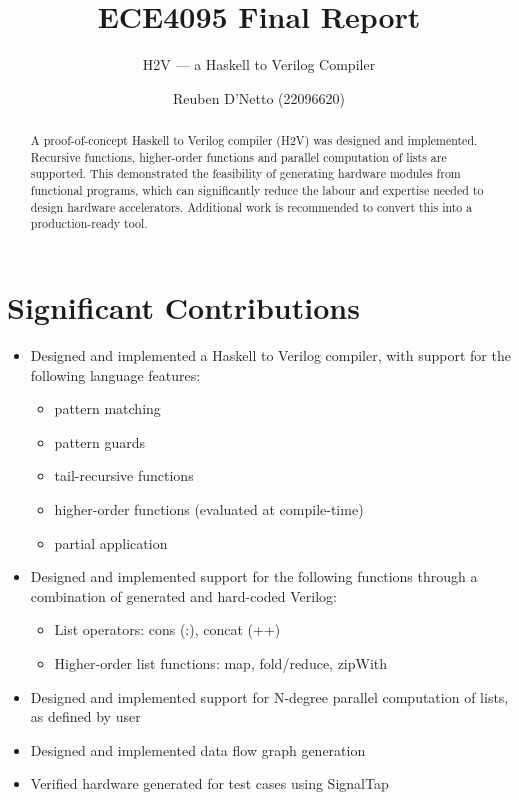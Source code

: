 \documentclass[english,onecolumn]{scrartcl}
\begin{document}
\title{ECE4095 Final Report}
\subtitle{H2V --- a Haskell to Verilog Compiler}
\author{Reuben D'Netto (22096620)}
\maketitle

\begin{abstract}
A proof-of-concept Haskell to Verilog compiler (H2V) was designed and implemented.
Recursive functions, higher-order functions and parallel computation of lists are supported.
This demonstrated the feasibility of generating hardware modules from functional programs, which can significantly reduce
the labour and expertise needed to design hardware accelerators.
Additional work is recommended to convert this into a production-ready tool.
\end{abstract}

\pagebreak{}
\tableofcontents{}
\pagebreak{}


\section{Significant Contributions}
\begin{itemize}
    \item Designed and implemented a Haskell to Verilog compiler, with support for the following language features:
        \begin{itemize}
            \item pattern matching
            \item pattern guards
            \item tail-recursive functions
            \item higher-order functions (evaluated at compile-time)
            \item partial application
        \end{itemize}
    \item Designed and implemented support for the following functions through a combination of generated and hard-coded Verilog:
        \begin{itemize}
            \item List operators: cons (:), concat (++)
            \item Higher-order list functions: map, fold/reduce, zipWith
        \end{itemize}
    \item Designed and implemented support for N-degree parallel computation of lists, as defined by user
    \item Designed and implemented data flow graph generation
    \item Verified hardware generated for test cases using SignalTap
\end{itemize}
\end{document}
